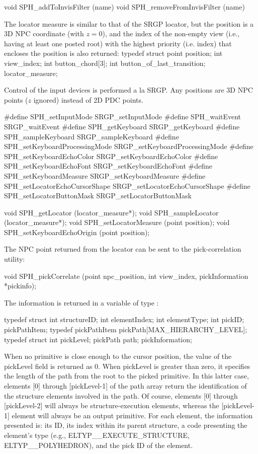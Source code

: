 \begincode
void SPH_addToInvisFilter (name)
void SPH_removeFromInvisFilter (name)
\endcode




The locator measure is similar to that of the SRGP locator, but the position is
a 3D NPC coordinate (with $z=0$), and the index of the non-empty view (i.e.,
having at least one posted root) with the highest priority (i.e. index)
that encloses the position is also returned:
\begincode
typedef struct \lb
    point position;
    int   view_index;
    int   button_chord[3];
    int   button_of_last_transition;
\rb locator_measure;
\endcode

\newpar
Control of the input devices is performed a la SRGP.  Any positions are 3D
NPC points ($z$ ignored) instead of 2D PDC points.

\begincode
#define SPH_setInputMode SRGP_setInputMode
#define SPH_waitEvent SRGP_waitEvent
#define SPH_getKeyboard SRGP_getKeyboard
#define SPH_sampleKeyboard SRGP_sampleKeyboard
#define SPH_setKeyboardProcessingMode SRGP_setKeyboardProcessingMode
#define SPH_setKeyboardEchoColor SRGP_setKeyboardEchoColor
#define SPH_setKeyboardEchoFont SRGP_setKeyboardEchoFont
#define SPH_setKeyboardMeasure SRGP_setKeyboardMeasure
#define SPH_setLocatorEchoCursorShape SRGP_setLocatorEchoCursorShape
#define SPH_setLocatorButtonMask SRGP_setLocatorButtonMask

void SPH_getLocator (locator_measure*);
void SPH_sampleLocator (locator_measure*);
void SPH_setLocatorMeasure (point position);
void SPH_setKeyboardEchoOrigin (point position);
\endcode


The NPC point returned from the locator can be sent to the pick-correlation
utility: 

\begincode
void SPH_pickCorrelate (point npc_position, int view_index, 
			pickInformation *pickinfo);
\endcode

\newpar
The information is returned in a variable of type :

\begincode
typedef
   struct \lb
     int structureID;
     int elementIndex;
     int elementType;   
     int pickID;
   \rb pickPathItem;
typedef pickPathItem pickPath[MAX_HIERARCHY_LEVEL];
typedef struct \lb
     int pickLevel;
     pickPath path;
   \rb pickInformation;
\endcode

\newpar
When no primitive is close enough to the cursor position, the value of the
pickLevel field is returned as 0.  When pickLevel is greater than zero, it
specifies the length of the path from the root to the picked primitive.  In
this latter case, elements [0] through [pickLevel-1] 
of the path array return the
identification of the structure elements involved in the path.  
Of course,
elements [0] through [pickLevel-2] will always be structure-execution elements,
whereas the [pickLevel-1] element will always be an output primitive.  For each
element, the information presented is: its ID, its index within its parent
structure, a code presenting the element's type (e.g.,
ELTYP\_\_EXECUTE\_STRUCTURE, 
ELTYP\_\_POLYHEDRON), and the pick ID of the element.

